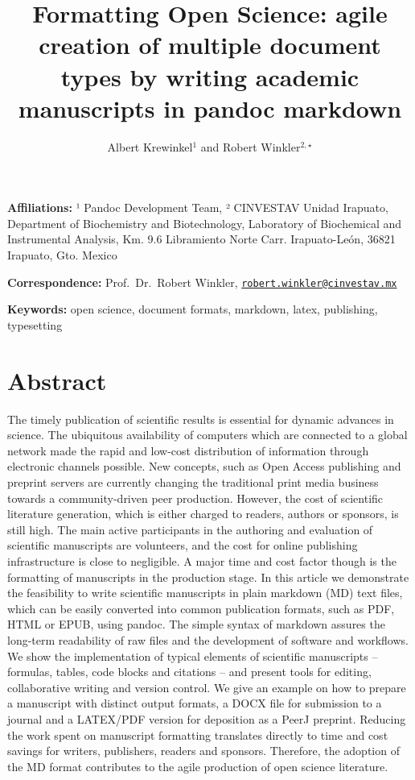 \documentclass[10pt,fleqn]{wlpeerj}
\title{Formatting
Open
Science:
agile
creation
of
multiple
document
types
by
writing
academic
manuscripts
in
pandoc
markdown}
\author{Albert
Krewinkel\(^1\)
and
Robert
Winkler\(^{2,\star}\)}
\date{}
\begin{document}
\flushbottom
\maketitle
\thispagestyle{empty}

\textbf{Affiliations:}
¹
Pandoc
Development
Team,
²
CINVESTAV
Unidad
Irapuato,
Department
of
Biochemistry
and
Biotechnology,
Laboratory
of
Biochemical
and
Instrumental
Analysis,
Km.
9.6
Libramiento
Norte
Carr.
Irapuato-León,
36821
Irapuato,
Gto.
Mexico

\textbf{Correspondence:}
Prof.~Dr.~Robert
Winkler,
\href{mailto:robert.winkler@cinvestav.mx}{\nolinkurl{robert.winkler@cinvestav.mx}}

\textbf{Keywords:}
open
science,
document
formats,
markdown,
latex,
publishing,
typesetting

\section{Abstract}\label{abstract}

The
timely
publication
of
scientific
results
is
essential
for
dynamic
advances
in
science.
The
ubiquitous
availability
of
computers
which
are
connected
to a
global
network
made
the
rapid
and
low-cost
distribution
of
information
through
electronic
channels
possible.
New
concepts,
such
as
Open
Access
publishing
and
preprint
servers
are
currently
changing
the
traditional
print
media
business
towards
a
community-driven
peer
production.
However,
the
cost
of
scientific
literature
generation,
which
is
either
charged
to
readers,
authors
or
sponsors,
is
still
high.
The
main
active
participants
in
the
authoring
and
evaluation
of
scientific
manuscripts
are
volunteers,
and
the
cost
for
online
publishing
infrastructure
is
close
to
negligible.
A
major
time
and
cost
factor
though
is
the
formatting
of
manuscripts
in
the
production
stage.
In
this
article
we
demonstrate
the
feasibility
to
write
scientific
manuscripts
in
plain
markdown
(MD)
text
files,
which
can
be
easily
converted
into
common
publication
formats,
such
as
PDF,
HTML
or
EPUB,
using
pandoc.
The
simple
syntax
of
markdown
assures
the
long-term
readability
of
raw
files
and
the
development
of
software
and
workflows.
We
show
the
implementation
of
typical
elements
of
scientific
manuscripts
--
formulas,
tables,
code
blocks
and
citations
--
and
present
tools
for
editing,
collaborative
writing
and
version
control.
We
give
an
example
on
how
to
prepare
a
manuscript
with
distinct
output
formats,
a
DOCX
file
for
submission
to a
journal
and a
LATEX/PDF
version
for
deposition
as a
PeerJ
preprint.
Reducing
the
work
spent
on
manuscript
formatting
translates
directly
to
time
and
cost
savings
for
writers,
publishers,
readers
and
sponsors.
Therefore,
the
adoption
of
the
MD
format
contributes
to
the
agile
production
of
open
science
literature.
\end{document}
